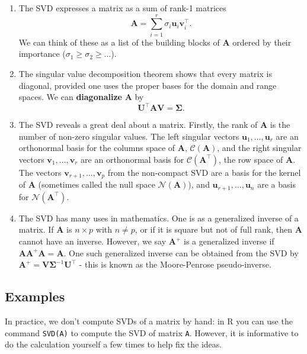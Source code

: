 \documentclass[]{book}
\theoremstyle{definition}
\theoremstyle{definition}
\theoremstyle{definition}
\theoremstyle{remark}
\begin{document}
\begin{enumerate}
\def\labelenumi{\arabic{enumi}.}
\item
  The SVD expresses a matrix as a sum of rank-1 matrices
  \[\boldsymbol A= \sum_{i=1}^r \sigma_i \boldsymbol u_i \boldsymbol v_i^\top.\]
  We can think of these as a list of the building blocks of \(\boldsymbol A\) ordered by their importance (\(\sigma_1\geq \sigma_2\geq\ldots\)).
\item
  The singular value decomposition theorem shows that every matrix is diagonal, provided one uses the proper bases for the domain and range spaces. We can \textbf{diagonalize} \(\boldsymbol A\) by
  \[ \boldsymbol U^\top\boldsymbol A\boldsymbol V=\boldsymbol \Sigma.\]
\item
  The SVD reveals a great deal about a matrix. Firstly, the rank of \(\boldsymbol A\) is the number of non-zero singular values. The left singular vectors \(\boldsymbol u_1, \ldots, \boldsymbol u_r\) are an orthonormal basis for the columns space of \(\boldsymbol A\), \(\mathcal{C}(\boldsymbol A)\), and the right singular vectors \(\boldsymbol v_1, \ldots, \boldsymbol v_r\) are an orthonormal basis for \(\mathcal{C}(\boldsymbol A^\top)\), the row space of \(\boldsymbol A\). The vectors \(\boldsymbol v_{r+1}, \ldots, \boldsymbol v_p\) from the non-compact SVD are a basis for the kernel of \(\boldsymbol A\) (sometimes called the null space \(\mathcal{N}(\boldsymbol A)\)), and \(\boldsymbol u_{r+1}, \ldots, \boldsymbol u_n\) are a basis for \(\mathcal{N}(\boldsymbol A^\top)\).
\item
  The SVD has many uses in mathematics. One is as a generalized inverse of a matrix. If \(\boldsymbol A\) is \(n \times p\) with \(n\not = p\), or if it is square but not of full rank, then \(\boldsymbol A\) cannot have an inverse. However, we say \(\boldsymbol A^+\) is a generalized inverse if \(\boldsymbol A\boldsymbol A^+\boldsymbol A=\boldsymbol A\). One such generalized inverse can be obtained from the SVD by \(\boldsymbol A^+ = \boldsymbol V\boldsymbol \Sigma^{-1}\boldsymbol U^\top\) - this is known as the Moore-Penrose pseudo-inverse.
\end{enumerate}

\hypertarget{examples}{%
\subsection{Examples}\label{examples}}

In practice, we don't compute SVDs of a matrix by hand: in R you can use the command \texttt{SVD(A)} to compute the SVD of matrix \texttt{A}. However, it is informative to do the calculation yourself a few times to help fix the ideas.
\end{document}
